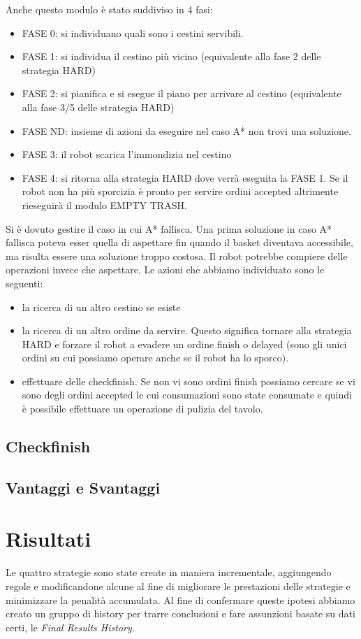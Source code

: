 Anche questo modulo è stato suddiviso in 4 fasi:
\begin{itemize}
  \item FASE 0: si individuano quali sono i cestini servibili.
  \item FASE 1: si individua il cestino più vicino (equivalente alla fase 2 delle strategia HARD)
  \item FASE 2: si pianifica e si esegue il piano per arrivare al cestino (equivalente alla fase 3/5 delle strategia HARD)
  \item FASE ND: insieme di azioni da eseguire nel caso A* non trovi una soluzione.
  \item FASE 3: il robot scarica l'immondizia nel cestino
  \item FASE 4: si ritorna alla strategia HARD dove verrà eseguita la FASE 1. Se il robot non ha più sporcizia è pronto per servire ordini accepted altrimente rieseguirà il modulo EMPTY TRASH.
\end{itemize}

Si è dovuto gestire il caso in cui A* fallisca. Una prima soluzione in caso A* fallisca poteva esser quella di aspettare fin quando il basket diventava accessibile, ma risulta essere una soluzione troppo costosa. Il robot potrebbe compiere delle operazioni invece che aspettare. Le azioni che abbiamo individuato sono le seguenti:
\begin{itemize}
  \item la ricerca di un altro cestino se esiste
  \item la ricerca di un altro ordine da servire. Questo significa tornare alla strategia HARD e forzare il robot a evadere un ordine finish o delayed (sono gli unici ordini su cui possiamo operare anche se il robot ha lo sporco).
  \item effettuare delle checkfinish. Se non vi sono ordini finish possiamo cercare se vi sono degli ordini accepted le cui consumazioni sono state consumate e quindi è possibile effettuare un operazione di pulizia del tavolo.
\end{itemize}


\subsection{Checkfinish}
\subsection{Vantaggi e Svantaggi}

\section{Risultati}
Le quattro strategie sono state create in maniera incrementale, aggiungendo regole e modificandone alcune al fine di migliorare le prestazioni delle strategie e minimizzare la penalità accumulata. Al fine di confermare queste ipotesi abbiamo creato un gruppo di history per trarre conclusioni e fare assunzioni basate su dati certi, le \emph{Final Results History}.

